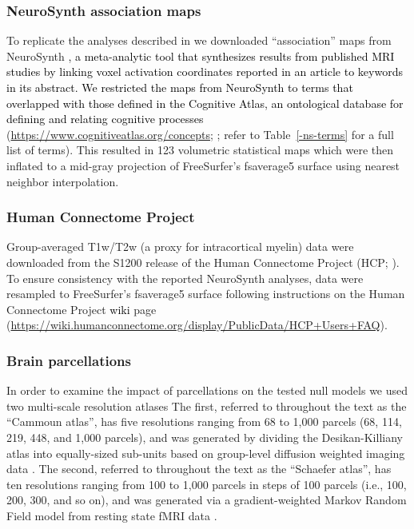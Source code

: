 \documentclass[12pt,aps,pra,reprint,showkeys]{revtex4-1}
\newcommand{\nimg}[1]{\textcolor{black}{{#1}}}
\begin{document}
\subsubsection*{NeuroSynth association maps}

To replicate the analyses described in \citet{alexanderbloch2018neuroimage} we downloaded ``association'' maps from NeuroSynth \citep{yarkoni2011natmethods}\nimg{, a meta-analytic tool that synthesizes results from published MRI studies by linking voxel activation coordinates reported in an article to keywords in its abstract.
We restricted the maps from NeuroSynth to terms that overlapped with those defined in the Cognitive Atlas, an ontological database for defining and relating cognitive processes} (\url{https://www.cognitiveatlas.org/concepts}; \citealt{poldrack2011frontiers, poldrack2011neuron, poldrack2016annrevpsych}; refer to Table~\ref{-ns-terms} for a full list of terms).
This resulted in 123 volumetric statistical maps which were then inflated to a mid-gray projection of FreeSurfer's fsaverage5 surface using nearest neighbor interpolation.

\subsubsection*{Human Connectome Project}

Group-averaged T1w/T2w (a proxy for intracortical myelin) data were downloaded from the S1200 release of the Human Connectome Project (HCP; \citealt{vanessen2013neuroimage}).
To ensure consistency with the reported NeuroSynth analyses, data were resampled to FreeSurfer's fsaverage5 surface following instructions on the Human Connectome Project \nimg{wiki} page (\url{https://wiki.humanconnectome.org/display/PublicData/HCP+Users+FAQ}).

\subsubsection*{Brain parcellations}

In order to examine the impact of parcellations on the tested null models we used two multi-scale resolution atlases
The first, referred to throughout the text as the ``Cammoun atlas'', has five resolutions ranging from 68 to 1,000 parcels (68, 114, 219, 448, and 1,000 parcels), and was generated by dividing the Desikan-Killiany atlas \citep{desikan2006automated} into equally-sized sub-units based on group-level diffusion weighted imaging data \citep{cammoun2012mapping}.
The second, referred to throughout the text as the ``Schaefer atlas'', has ten resolutions ranging from 100 to 1,000 parcels in steps of 100 parcels (i.e., 100, 200, 300, and so on), and was generated via a gradient-weighted Markov Random Field model from resting state fMRI data \citep{schaefer2018cercor}.
\end{document}
